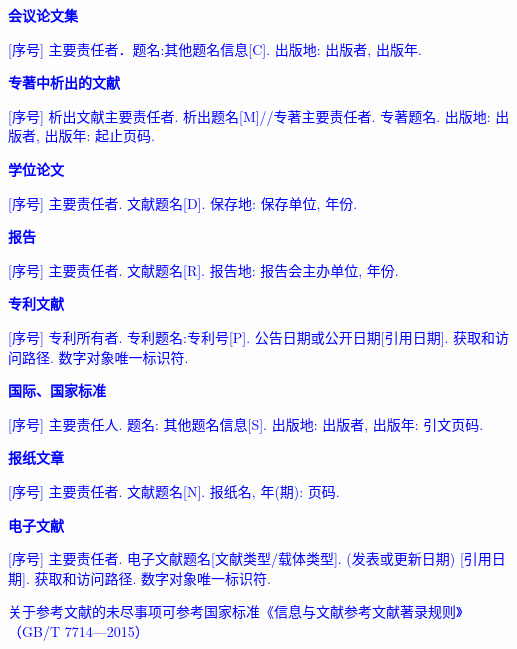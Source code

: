 \begin{bibprint}
\textcolor{blue}{\textbf{会议论文集}}

\noindent\textcolor{blue}{[序号] 主要责任者．题名:其他题名信息[C]. 出版地: 出版者, 出版年. }
\cite{雷光春2012}

\printbibliography [type=proceedings,heading=none]

\textcolor{blue}{\textbf{专著中析出的文献}}

\noindent\textcolor{blue}{[序号] 析出文献主要责任者. 析出题名[M]//专著主要责任者. 专著题名. 出版地: 出版者, 出版年: 起止页码. }
\cite{白书农}

\printbibliography [type=inbook,heading=none]

\textcolor{blue}{\textbf{学位论文}}

\noindent\textcolor{blue}{[序号] 主要责任者. 文献题名[D]. 保存地: 保存单位, 年份. }
\cite{zhanghesheng, Sobieski}

\printbibliography [keyword={thesis},heading=none]

\textcolor{blue}{\textbf{报告}}

\noindent\textcolor{blue}{[序号] 主要责任者. 文献题名[R]. 报告地: 报告会主办单位, 年份. }
\cite{fengxiqiao, Sobieszczanski}

\printbibliography [keyword={techreport},heading=none]

\textcolor{blue}{\textbf{专利文献}}

\noindent\textcolor{blue}{[序号] 专利所有者. 专利题名:专利号[P]. 公告日期或公开日期[引用日期]. 获取和访问路径. 数字对象唯一标识符.}
\cite{jiangxizhou}

\printbibliography [type=patent,heading=none]

\textcolor{blue}{\textbf{国际、国家标准}}

\noindent\textcolor{blue}{[序号] 主要责任人. 题名: 其他题名信息[S]. 出版地: 出版者, 出版年: 引文页码.}
\cite{GB/T3792.4-2009}

\printbibliography [keyword={standard},heading=none]

\textcolor{blue}{\textbf{报纸文章}}

\noindent\textcolor{blue}{[序号] 主要责任者. 文献题名[N]. 报纸名, 年(期): 页码. }
\cite{xiexide}

\printbibliography [keyword={newspaper},heading=none]

\textcolor{blue}{\textbf{电子文献}}

\noindent\textcolor{blue}{[序号] 主要责任者. 电子文献题名[文献类型/载体类型]. (发表或更新日期) [引用日期]. 获取和访问路径. 数字对象唯一标识符. }
\cite{yaoboyuan}

\printbibliography [keyword={online},heading=none]

\textcolor{blue}{关于参考文献的未尽事项可参考国家标准《信息与文献参考文献著录规则》（GB/T 7714—2015）}

\end{bibprint}

